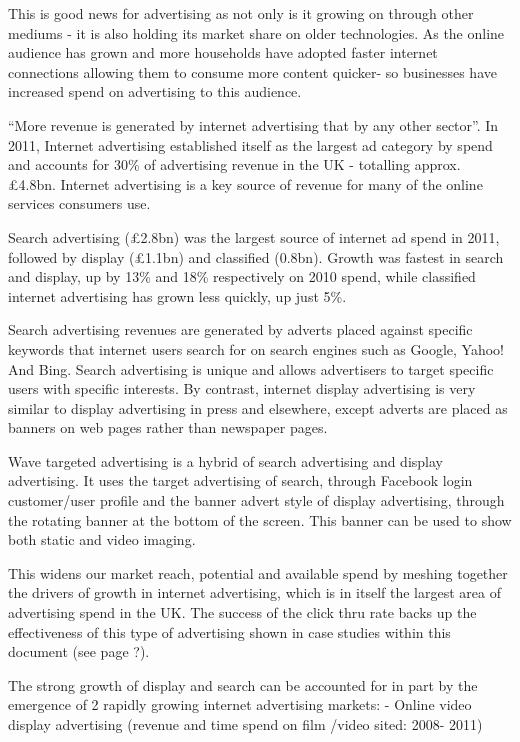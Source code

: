 \documentclass[letterpaper,10pt,openany,oneside,english]{sphinxmanual}
\begin{document}
This is good news for advertising as not only is it growing on through other mediums - it is also holding its market share on older technologies. As the online audience has grown and more households have adopted faster internet connections \textendash{} allowing them to consume more content quicker- so businesses have increased spend on advertising to this audience.


“More revenue is generated by internet advertising that by any other sector”. In 2011, Internet advertising established itself as the largest ad category by spend and accounts for 30\% of advertising revenue in the UK - totalling approx. £4.8bn. Internet advertising is a key source of revenue for many of the online services consumers use.

Search advertising (£2.8bn) was the largest source of internet ad spend in 2011, followed by display (£1.1bn) and classified (0.8bn). Growth was fastest in search and display, up by 13\% and 18\% respectively on 2010 spend, while classified internet advertising has grown less quickly, up just 5\%.

Search advertising revenues are generated by adverts placed against specific keywords that internet users search for on search engines such as Google, Yahoo! And Bing. Search advertising is unique and allows advertisers to target specific users with specific interests. By contrast, internet display advertising is very similar to display advertising in press and elsewhere, except adverts are placed as banners on web pages rather than newspaper pages.

Wave targeted advertising is a hybrid of search advertising and display advertising. It uses the target advertising of search, through Facebook login customer/user profile and the banner advert style of display advertising, through the rotating banner at the bottom of the screen. This banner can be used to show both static and video imaging.

This widens our market reach, potential and available spend by meshing together the drivers of growth in internet advertising, which is in itself the largest area of advertising spend in the UK. The success of the click thru rate backs up the effectiveness of this type of advertising shown in case studies within this document (see page ?).

The strong growth of display and search can be accounted for in part by the emergence of 2 rapidly growing internet advertising markets: - Online video display advertising (revenue and time spend on film /video sited: 2008- 2011)
\end{document}
